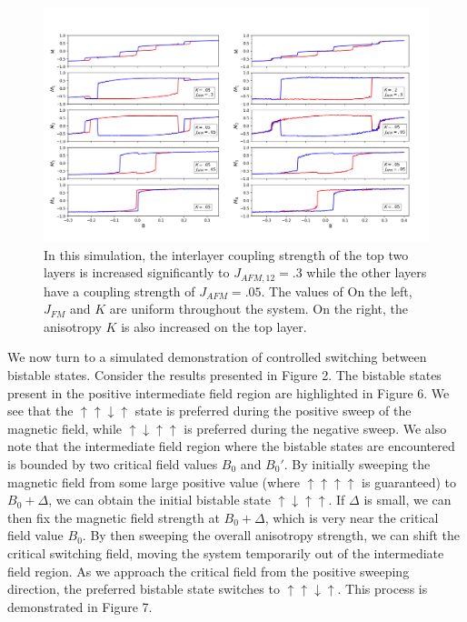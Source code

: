 \documentclass[10pt]{article}
\begin{document}
\begin{figure}[!htb]
\includegraphics[width=\textwidth]{strong.png}
\caption{In this simulation, the interlayer coupling strength of the top two layers is increased significantly to $J_{AFM,12} = .3$ while the other layers have a coupling strength of $J_{AFM} = .05$. The values of
On the left, $J_{FM}$ and $K$ are uniform throughout the system. On the right, the anisotropy $K$ is also increased on the top layer. }
\end{figure}


\pagebreak
We now turn to a simulated demonstration of controlled switching between bistable states. Consider the results presented in Figure 2. The bistable states present in the positive intermediate field region are highlighted in Figure 6.
We see that the $\uparrow \uparrow \downarrow \uparrow$ state is preferred during the positive sweep of the magnetic field, while  $\uparrow \downarrow \uparrow  \uparrow$ is preferred during the negative sweep. We also note that the
intermediate field region where the bistable states are encountered is bounded by two critical field values $B_{0}$ and $B_{0}'$. By initially sweeping the magnetic field from some large positive value (where
$\uparrow \uparrow \uparrow  \uparrow$ is guaranteed) to $B_{0} + \Delta$, we can obtain the initial bistable state $\uparrow \downarrow \uparrow \uparrow$. If $\Delta$ is small, we can then fix the
magnetic field strength at $B_{0} + \Delta$, which is very near the critical field value $B_{0}$. By then sweeping the overall anisotropy strength, we can shift the critical switching field, moving the
system temporarily out of the intermediate field region. As we approach the critical field from the positive sweeping direction, the preferred bistable state switches to
$\uparrow \uparrow \downarrow  \uparrow$. This process is demonstrated in Figure 7.
\end{document}
